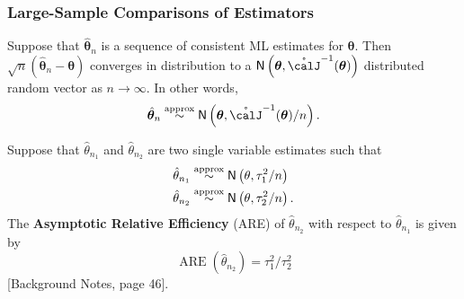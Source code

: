 \subsubsection*{Large-Sample Comparisons of Estimators}

\begin{thm} \label{thm: large_samp_est}
    Suppose that $\hat{\bm{\theta}}_n$ is a sequence of consistent ML estimates for $\bm{\theta}$. Then $\sqrt{n} \left( \hat{\bm{\theta}}_n - \bm{\theta} \right)$ converges in distribution to a $\Nor \left( \bm{\theta} , \mathring{\calJ}^{-1} (\bm{\theta}) \right)$ distributed random vector as $n \to \infty$. In other words,
    \begin{align*}
        \hat{\bm{\theta}}_n \overset{\text{approx}}{\sim} \Nor \left( \bm{\theta} , \mathring{\calJ}^{-1} (\bm{\theta}) / n \right) .
    \end{align*}
\end{thm}

\begin{defe} \label{defe: are}
    Suppose that $\hat{\theta}_{n_1}$ and $\hat{\theta}_{n_2}$ are two single variable estimates such that
    \begin{align*}
        \hat{\theta}_{n_1} & \overset{\text{approx}}{\sim} {\sf N} \left( \theta , \tau_1^2 / n \right)  \\
        \hat{\theta}_{n_2} & \overset{\text{approx}}{\sim} {\sf N} \left( \theta , \tau_2^2 / n \right).
    \end{align*}
    The {\bf Asymptotic Relative Efficiency} (ARE) of $\hat{\theta}_{n_2}$ with respect to $\hat{\theta}_{n_1}$ is given by
    \begin{equation*}
        \operatorname{ARE} (\hat{\theta}_{n_2}) = \tau_1^2 / \tau_2^2
    \end{equation*}
    [Background Notes, page 46].
\end{defe}

